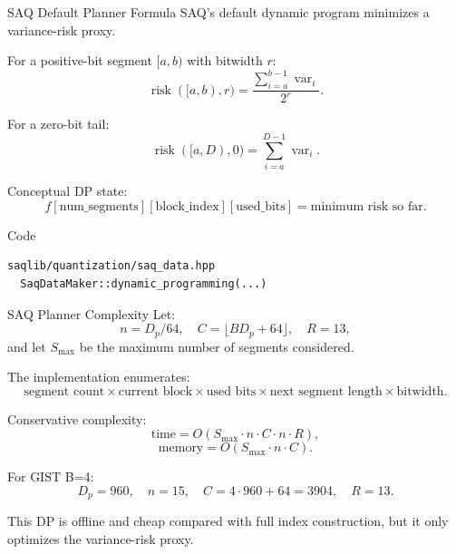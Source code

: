 \documentclass[aspectratio=169,10pt]{beamer}
\begin{document}
\begin{frame}[fragile]{SAQ Default Planner Formula}
\small
SAQ's default dynamic program minimizes a variance-risk proxy.

\vspace{0.5em}
For a positive-bit segment \([a,b)\) with bitwidth \(r\):
\[
\operatorname{risk}([a,b),r)
= \frac{\sum_{i=a}^{b-1}\operatorname{var}_i}{2^r}.
\]

For a zero-bit tail:
\[
\operatorname{risk}([a,D),0)
= \sum_{i=a}^{D-1}\operatorname{var}_i.
\]

Conceptual DP state:
\[
f[\text{num\_segments}][\text{block\_index}][\text{used\_bits}]
= \text{minimum risk so far}.
\]

\begin{block}{Code}
\begin{lstlisting}
saqlib/quantization/saq_data.hpp
  SaqDataMaker::dynamic_programming(...)
\end{lstlisting}
\end{block}
\end{frame}

\begin{frame}[fragile]{SAQ Planner Complexity}
\small
Let:
\[
n = D_p/64,\quad C = \lfloor B D_p + 64 \rfloor,\quad R = 13,
\]
and let \(S_{\max}\) be the maximum number of segments considered.

\vspace{0.5em}
The implementation enumerates:
\[
\text{segment count} \times \text{current block} \times
\text{used bits} \times \text{next segment length} \times \text{bitwidth}.
\]

Conservative complexity:
\[
\text{time} = O(S_{\max} \cdot n \cdot C \cdot n \cdot R),
\]
\[
\text{memory} = O(S_{\max} \cdot n \cdot C).
\]

For GIST B=4:
\[
D_p=960,\quad n=15,\quad C=4\cdot960+64=3904,\quad R=13.
\]

\vspace{0.4em}
This DP is offline and cheap compared with full index construction, but it only
optimizes the variance-risk proxy.
\end{frame}
\end{document}
